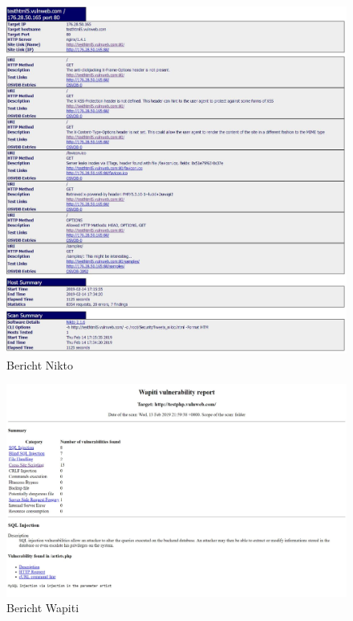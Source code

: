 \documentclass[12pt,oneside,a4paper,parskip,pointlessnumbers]{scrbook}
\begin{document}
  \begin{figure}[htb!]
    \centering
      \includegraphics[width=1.05\textwidth]{Images/ScrNikto}
    \caption[Bericht Nikto]{Bericht Nikto}
  \end{figure}
  \begin{figure}[htb!]
    \centering
      \includegraphics[width=1.05\textwidth]{Images/ScrWapiti}
    \caption[Bericht Wapiti]{Bericht Wapiti}
  \end{figure}
\end{document}
